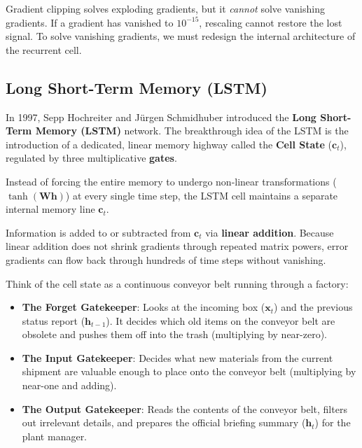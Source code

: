 Gradient clipping solves exploding gradients, but it \emph{cannot} solve vanishing gradients. If a gradient has vanished to $10^{-15}$, rescaling cannot restore the lost signal. To solve vanishing gradients, we must redesign the internal architecture of the recurrent cell.

\subsection{Long Short-Term Memory (LSTM)}\label{subsec:lstm}

In 1997, Sepp Hochreiter and J{\"u}rgen Schmidhuber introduced the \textbf{Long Short-Term Memory (LSTM)} network. The breakthrough idea of the LSTM is the introduction of a dedicated, linear memory highway called the \textbf{Cell State} ($\mathbf{c}_t$), regulated by three multiplicative \textbf{gates}.

\begin{keyidea}
Instead of forcing the entire memory to undergo non-linear transformations ($\tanh(\mathbf{W}\mathbf{h})$) at every single time step, the LSTM cell maintains a separate internal memory line $\mathbf{c}_t$. 

Information is added to or subtracted from $\mathbf{c}_t$ via \textbf{linear addition}. Because linear addition does not shrink gradients through repeated matrix powers, error gradients can flow back through hundreds of time steps without vanishing.
\end{keyidea}

\begin{analogy}
Think of the cell state as a continuous conveyor belt running through a factory:
\begin{itemize}
    \item \textbf{The Forget Gatekeeper}: Looks at the incoming box ($\mathbf{x}_t$) and the previous status report ($\mathbf{h}_{t-1}$). It decides which old items on the conveyor belt are obsolete and pushes them off into the trash (multiplying by near-zero).
    \item \textbf{The Input Gatekeeper}: Decides what new materials from the current shipment are valuable enough to place onto the conveyor belt (multiplying by near-one and adding).
    \item \textbf{The Output Gatekeeper}: Reads the contents of the conveyor belt, filters out irrelevant details, and prepares the official briefing summary ($\mathbf{h}_t$) for the plant manager.
\end{itemize}
\end{analogy}

